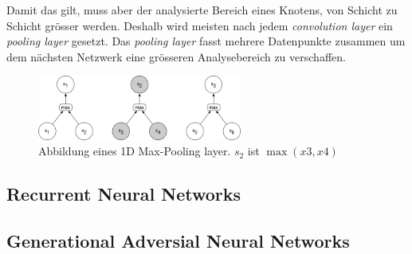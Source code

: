 Damit das gilt, muss aber der analysierte Bereich eines Knotens, von Schicht zu Schicht grösser werden. Deshalb wird meisten nach jedem \textit{convolution layer} ein \textit{pooling layer} gesetzt. Das \textit{pooling layer} fasst mehrere Datenpunkte zusammen um dem nächsten Netzwerk eine grösseren Analysebereich zu verschaffen.
\begin{figure}[hbt]
	\centering
		\includegraphics[width=0.6\textwidth]{assets/pooling_1d.png}
	\caption{Abbildung eines 1D Max-Pooling layer. $s_2$ ist $\max (x3, x4)$}
	\label{img:pool}
\end{figure}


\subsection{Recurrent Neural Networks}
\subsection{Generational Adversial Neural Networks}